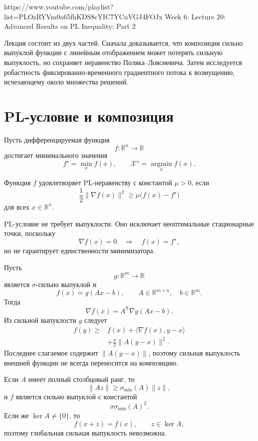 
\sourcevideo
    {https://www.youtube.com/playlist?list=PLOzRYVm0a65fhKDS8cYIC7YCuVGJ4FOJx}
    {Week 6: Lecture 20: Advanced Results on PL Inequality: Part 2}

Лекция состоит из двух частей. Сначала доказывается, что композиция
сильно выпуклой функции с линейным отображением может потерять
сильную выпуклость, но сохраняет неравенство Поляка--Лоясиевича.
Затем исследуется робастность фиксированно-временного градиентного
потока к возмущению, исчезающему около множества решений.

\section{PL-условие и композиция}

Пусть дифференцируемая функция
\[
    f\colon\mathbb R^n\to\mathbb R
\]
достигает минимального значения
\[
    f^\star=\min_x f(x),
    \qquad
    \mathcal X^\star=\operatorname*{argmin}_x f(x).
\]

\begin{definition}
Функция \(f\) удовлетворяет PL-неравенству с константой \(\mu>0\),
если
\[
    \frac12\lVert\nabla f(x)\rVert^2
    \ge
    \mu\bigl(f(x)-f^\star\bigr)
\]
для всех \(x\in\mathbb R^n\).
\end{definition}

PL-условие не требует выпуклости. Оно исключает неоптимальные
стационарные точки, поскольку
\[
    \nabla f(x)=0
    \quad\Longrightarrow\quad
    f(x)=f^\star,
\]
но не гарантирует единственности минимизатора.

Пусть
\[
    g\colon\mathbb R^m\to\mathbb R
\]
является \(\sigma\)-сильно выпуклой и
\[
    f(x)=g(Ax-b),
    \qquad
    A\in\mathbb R^{m\times n},
    \quad
    b\in\mathbb R^m.
\]
Тогда
\[
    \nabla f(x)=A^{\mathsf T}\nabla g(Ax-b).
\]
Из сильной выпуклости \(g\) следует
\[
\begin{aligned}
    f(y)
    \ge{}&
    f(x)
    +\langle\nabla f(x),y-x\rangle
    \\
    &+
    \frac\sigma2
    \lVert A(y-x)\rVert^2.
\end{aligned}
\]
Последнее слагаемое содержит \(\lVert A(y-x)\rVert\), поэтому
сильная выпуклость внешней функции не всегда переносится на
композицию.

Если \(A\) имеет полный столбцовый ранг, то
\[
    \lVert Az\rVert
    \ge
    \sigma_{\min}(A)\lVert z\rVert,
\]
и \(f\) является сильно выпуклой с константой
\[
    \sigma\sigma_{\min}(A)^2.
\]
Если же \(\ker A\ne\{0\}\), то
\[
    f(x+z)=f(x),
    \qquad
    z\in\ker A,
\]
поэтому глобальная сильная выпуклость невозможна.

